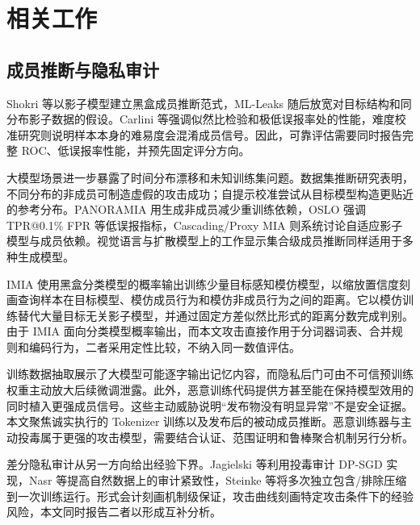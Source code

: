 \section{相关工作}

\subsection{成员推断与隐私审计}

Shokri 等以影子模型建立黑盒成员推断范式\cite{shokri2017mia}，ML-Leaks 随后放宽对目标结构和同分布影子数据的假设\cite{salem2019mlleaks}。Carlini 等强调似然比检验和极低误报率处的性能\cite{carlini2022firstprinciples}，难度校准研究则说明样本本身的难易度会混淆成员信号\cite{watson2022difficulty}。因此，可靠评估需要同时报告完整 ROC、低误报率性能，并预先固定评分方向。

大模型场景进一步暴露了时间分布漂移和未知训练集问题。数据集推断研究表明，不同分布的非成员可制造虚假的攻击成功\cite{maini2024dataset}；自提示校准尝试从目标模型构造更贴近的参考分布\cite{fu2024spvmia}。PANORAMIA 用生成非成员减少重训练依赖\cite{kazmi2024panoramia}，OSLO 强调 TPR@0.1\% FPR 等低误报指标\cite{peng2024oslo}，Cascading/Proxy MIA 则系统讨论自适应影子模型与成员依赖\cite{du2026cascading}。视觉语言与扩散模型上的工作显示集合级成员推断同样适用于多种生成模型\cite{hu2025vlmmia,zhai2024clid,pang2025diffusionmia}。

IMIA 使用黑盒分类模型的概率输出训练少量目标感知模仿模型，以缩放置信度刻画查询样本在目标模型、模仿成员行为和模仿非成员行为之间的距离\cite{du2026imia}。它以模仿训练替代大量目标无关影子模型，并通过固定方差似然比形式的距离分数完成判别。由于 IMIA 面向分类模型概率输出，而本文攻击直接作用于分词器词表、合并规则和编码行为，二者采用定性比较，不纳入同一数值评估。

训练数据抽取展示了大模型可能逐字输出记忆内容\cite{carlini2021extract}，而隐私后门可由不可信预训练权重主动放大后续微调泄露\cite{wen2024privacybackdoors}。此外，恶意训练代码提供方甚至能在保持模型效用的同时植入更强成员信号\cite{chen2025facilitate}。这些主动威胁说明“发布物没有明显异常”不是安全证据。本文聚焦诚实执行的 Tokenizer 训练以及发布后的被动成员推断。恶意训练器与主动投毒属于更强的攻击模型，需要结合认证、范围证明和鲁棒聚合机制另行分析。

差分隐私审计从另一方向给出经验下界。Jagielski 等利用投毒审计 DP-SGD 实现\cite{jagielski2020audit}，Nasr 等提高自然数据上的审计紧致性\cite{nasr2023tight}，Steinke 等将多次独立包含/排除压缩到一次训练运行\cite{steinke2023one}。形式会计刻画机制级保证，攻击曲线刻画特定攻击条件下的经验风险，本文同时报告二者以形成互补分析。

